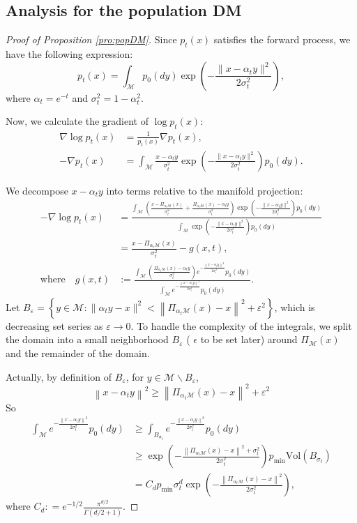 \documentclass{article}
\def\calM{\mathcal{M}}
\newcommand{\Prj}[1]{\Pi_{\mathcal{M}}(#1)}
\begin{document}
\subsection{Analysis for the population DM}
\label{sec:popDM}
\begin{proof}[Proof of Proposition \ref{pro:popDM}]
Since $p_t(x)$ satisfies the forward process, we have the following expression:
\[
p_t(x) = \int_{\calM} p_0(dy) \exp\left( -\frac{\|x - \alpha_t y\|^2}{2 \sigma_t^2} \right),
\]
where $\alpha_t = e^{-t}$ and $\sigma_t^2 = 1 - \alpha_t^2$. 

Now, we calculate the gradient of $\log p_t(x)$:
\[
\begin{aligned}
    \nabla \log p_t(x) &= \frac{1}{p_t(x)} \nabla p_t(x), \\
    -\nabla p_t(x) &= \int_{\calM} \frac{x - \alpha_t y}{\sigma_t^2} \exp\left( -\frac{\|x - \alpha_t y\|^2}{2 \sigma_t^2} \right) p_0(dy).
\end{aligned}
\]

We decompose $x - \alpha_t y$ into terms relative to the manifold projection:
\[
\begin{aligned}
-\nabla \log p_t(x) &= \frac{\int_{\calM} \left( \frac{x - \Pi_{\alpha_t\calM}(x)}{\sigma_t^2} + \frac{\Pi_{\alpha_t\calM}(x) -  \alpha_t y}{\sigma_t^2} \right) \exp\left( -\frac{\|x - \alpha_t y\|^2}{2 \sigma_t^2} \right) p_0(dy)}{\int_{\calM} \exp\left( -\frac{\|x - \alpha_t y\|^2}{2 \sigma_t^2} \right) p_0(dy)}\\
&= \frac{x-\Pi_{\alpha_t\mathcal{ M}}(x)}{\sigma_t^2} - g(x,t),\\
    \text{where}\quad 
    g(x,t)&:=\frac{\int_{\calM}( \frac{\Pi_{\alpha_t\mathcal{M}}(x)-\alpha_t y}{\sigma_t^2}) e^{-\frac{\left\|x-\alpha_t y\right\|^2}{2\sigma_t^2}} p_0(dy)}{\int_{\calM} e^{-\frac{\left\|x-\alpha_t y\right\|^2}{2\sigma_t^2}} p_0(dy)}.
\end{aligned}
\]
 Let $B_{\varepsilon}=\left\{y \in \calM:\|\alpha_t y-x\|^2<\left\|\Pi_{\alpha_t\mathcal{M}}(x)-x\right\|^2+\varepsilon^2\right\}$, which is decreasing set series as $\varepsilon \rightarrow 0$. To handle the complexity of the integrals, we split the domain into a small neighborhood $B_{\varepsilon}$ ( $\epsilon $ to be set later) around $\Prj{x}$ and the remainder of the domain. 

Actually, by definition of $B_{\varepsilon}$, for $y \in \calM \backslash B_{\varepsilon}$,
$$
\left\|x-\alpha_t y\right\|^2 \geq 
\left\|\Pi_{\alpha_t\mathcal{M}}(x)-x\right\|^2+\varepsilon^2$$
So
\begin{align*}
\int_{\calM} e^{-\frac{\left\|x-\alpha_t y\right\|^2}{2\sigma_t^2}} p_0(dy) &\geq
\int_{B_{\sigma_t}} e^{-\frac{\left\|x-\alpha_t y\right\|^2}{2\sigma_t^2}} p_0(dy)\\
&\geq \exp(-\frac{\left\|\Pi_{\alpha_t\mathcal{M}}(x)-x\right\|^2+\sigma_t^2}{2\sigma_t^2})p_{\min}\text{Vol}(B_{\sigma_t})\\
& = C_d   
p_{\min}\sigma_t^{d}\exp(-\frac{\left\|\Pi_{\alpha_t\mathcal{M}}(x)-x\right\|^2}{2\sigma_t^2}),
\end{align*}
where $C_d : = e^{-1/2} \frac{\pi^{d/2}}{\Gamma(d/2+1)}$.


\end{proof}
\end{document}
